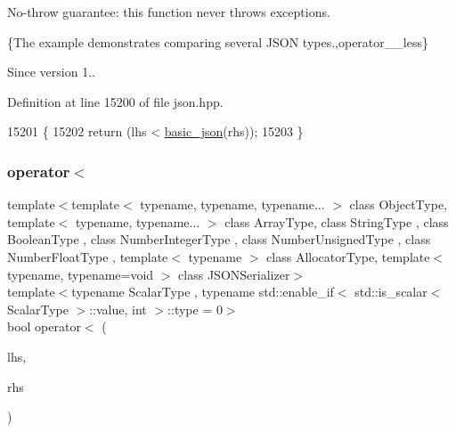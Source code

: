 No-\/throw guarantee\+: this function never throws exceptions.

\{The example demonstrates comparing several J\+S\+ON types.,operator\+\_\+\+\_\+less\}

\begin{DoxySince}{Since}
version 1.. 
\end{DoxySince}


Definition at line 15200 of file json.\+hpp.


\begin{DoxyCode}
15201     \{
15202         \textcolor{keywordflow}{return} (lhs < \hyperlink{classnlohmann_1_1basic__json_aed115142bd0c6c66c864700e0467df55}{basic\_json}(rhs));
15203     \}
\end{DoxyCode}
\mbox{\label{classnlohmann_1_1basic__json_abed3e9b4ab75f5bcbd3cd20f5af5cdab}} 
\subsubsection{\texorpdfstring{operator$<$}{operator<}\hspace{0.1cm}{\footnotesize\ttfamily [3/3]}}
{\footnotesize\ttfamily template$<$template$<$ typename, typename, typename... $>$ class Object\+Type, template$<$ typename, typename... $>$ class Array\+Type, class String\+Type , class Boolean\+Type , class Number\+Integer\+Type , class Number\+Unsigned\+Type , class Number\+Float\+Type , template$<$ typename $>$ class Allocator\+Type, template$<$ typename, typename=void $>$ class J\+S\+O\+N\+Serializer$>$ \\
template$<$typename Scalar\+Type , typename std\+::enable\+\_\+if$<$ std\+::is\+\_\+scalar$<$ Scalar\+Type $>$\+::value, int $>$\+::type  = 0$>$ \\
bool operator$<$ (\begin{DoxyParamCaption}\item[{const Scalar\+Type}]{lhs,  }\item[{\hyperlink{classnlohmann_1_1basic__json_a4057c5425f4faacfe39a8046871786ca}{const\+\_\+reference}}]{rhs }\end{DoxyParamCaption})\hspace{0.3cm}{\ttfamily [friend]}}



